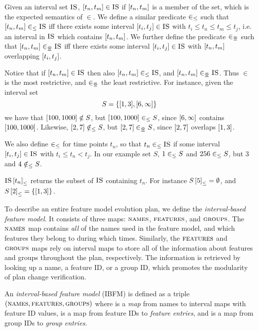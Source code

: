 Given an interval set $\textsc{IS}$, $\interval{t_n}{t_m} \in \map{IS}$ if $\interval{t_n}{t_m}$ is a member of the set, which is the expected semantics of $\in$. We define a similar predicate $\in_\leq$ such that $\interval{t_n}{t_m} \inn \map{IS}$ iff there exists some interval $\interval{t_i}{t_j} \in \map{IS}$ with $t_i \leq t_n \leq t_m \leq t_j$, i.e. an interval in $\textsc{IS}$ which contains $\interval{t_n}{t_m}$. We further define the predicate $\in_{\leq\!\!\!\!\geq{}}$ such that $\interval{t_n}{t_m} \innr \map{IS}$ iff there exists some interval $\interval{t_i}{t_j} \in \map{IS}$ with $\interval{t_n}{t_m}$ overlapping $\interval{t_i}{t_j}$. 

Notice that if $\interval{t_n}{t_m} \in \map{IS}$ then also $\interval{t_n}{t_m} \inn \map{IS}$, and $\interval{t_n}{t_m} \innr \map{IS}$. Thus $\in$ is the most restrictive, and $\in_{\leq\!\!\!\!\geq{}}$ the least restrictive.
For instance, given the interval set 
\[
  S = \set{\interval{1}{3}, \interval{6}{\forever}}
\]
we have that $\interval{100}{1000} \notin S$, but $\interval{100}{1000} \inn S$, since $\interval{6}{\forever}$ contains $\interval{100}{1000}$. Likewise,  $\interval{2}{7} \notinn S$, but $\interval{2}{7} \innr S$, since $\interval{2}{7}$ overlaps $\interval{1}{3}$.


We also define $\in_\leq$ for time points $t_n$, so that $t_n \in_\leq \textsc{IS}$ if some interval $\interval{t_i}{t_j} \in \map{IS}$ with $t_i \leq t_n < t_j$. In our example set $S$, $1 \in_\leq S$ and $256 \in_\leq S$, but $3$ and $4 \notin_\leq S$.

${\textsc{IS} \left[ t_n \right]}_{\leq}$ returns the subset of $\textsc{IS}$ containing $t_n$. For instance ${S \left[ 5 \right]}_{\leq} = \emptyset$, and $\containing{S}{2} = \set{\interval{1}{3}}$.

To describe an entire feature model evolution plan, we define the \emph{interval-based feature model}. It consists of three maps: $\textsc{names}{}$, $\textsc{features}{}$, and $\textsc{groups}{}{}$. The $\textsc{names}{}$ map contains \emph{all} of the names used in the feature model, and which features they belong to during which times. Similarly, the $\textsc{features}{}$ and $\textsc{groups}{}{}$ maps rely on interval maps to store all of the information about features and groups throughout the plan, respectively. The information is retrieved by looking up a name, a feature ID, or a group ID, which promotes the modularity of plan change verification.
\\

\begin{definition}
  An \emph{interval-based feature model} (IBFM) is defined as a triple $(\textsc{names}, \textsc{features}, \textsc{groups}{})$ where \names{} is a \emph{map} from names to interval maps with feature ID values, \features{} is a map from feature IDs to \emph{feature entries}, and \groups{} is a map from group IDs to \emph{group entries}. 
  \label{def:interval-based-feature-model}
\end{definition}

